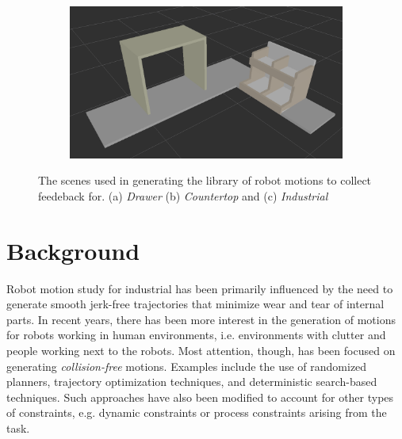 \documentclass[letterpaper, 10 pt, conference]{ieeeconf}  %
\begin{document}
\begin{figure}
  ~ %
  \begin{subfigure}[b]{0.38\textwidth}
    \includegraphics[trim = 0mm 0mm 0mm 0mm, width=\textwidth]{pictures/industrial_scene}
    \caption{}
    \label{fig:industrial_scene}
  \end{subfigure}
\caption{The scenes used in generating the library of robot motions to collect feedeback for. (a) \emph{Drawer} (b) \emph{Countertop} and (c) \emph{Industrial}}\label{fig:scenes}
\end{figure}

\section{Background}
\label{sec:background}

Robot motion study for industrial has been primarily influenced by the need to generate smooth jerk-free trajectories that minimize wear and tear of internal parts. In recent years, there has been more interest in the generation of motions for robots working in human environments, i.e. environments with clutter and people working next to the robots. Most attention, though, has been focused on generating {\em collision-free} motions. Examples include the use of randomized planners\cite{kuffner_RRT_icra00}, trajectory optimization techniques\cite{Mrinal:2011}, and deterministic search-based techniques\cite{Cohen:2012}. Such approaches have also been modified to account for other types of constraints, e.g. dynamic constraints or process constraints arising from the task. 
\end{document}
